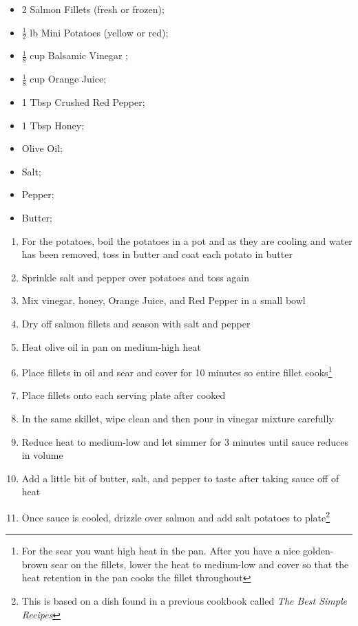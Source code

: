 \documentclass[oneside]{recipe}
\newcommand{\recipecolumn}[2]{
	\begin{multicols}{2}
	\raggedcolumns
	#1
	\columnbreak
	#2
	\end{multicols}
}
\begin{document}
\recipecolumn{
	\begin{itemize}
	\item 2 Salmon Fillets (fresh or frozen);
	\item $\frac{1}{2}$ lb Mini Potatoes (yellow or red);
	\item $\frac{1}{8}$ cup Balsamic Vinegar ;
	\item $\frac{1}{8}$ cup Orange Juice;
	\item 1 Tbsp Crushed Red Pepper;
	\item 1 Tbsp Honey;
	\item Olive Oil;
  \item Salt;
	\item Pepper;
	\item Butter;
	\end{itemize}
}{
	\begin{enumerate}
		\item For the potatoes, boil the potatoes in a pot and as they are cooling and water has been removed, toss in butter and coat each potato in butter
		\item Sprinkle salt and pepper over potatoes and toss again
		\item Mix vinegar, honey, Orange Juice, and Red Pepper in a small bowl
		\item Dry off salmon fillets and season with salt and pepper
		\item Heat olive oil in pan on medium-high heat
		\item Place fillets in oil and sear and cover for 10 minutes so entire fillet cooks\footnote{For the sear you want high heat in the pan. After you have a nice golden-brown sear on the fillets, lower the heat to medium-low and cover so that the heat retention in the pan cooks the fillet throughout}
		\item Place fillets onto each serving plate after cooked
		\item In the same skillet, wipe clean and then pour in vinegar mixture carefully
		\item Reduce heat to medium-low and let simmer for 3 minutes until sauce reduces in volume
		\item Add a little bit of butter, salt, and pepper to taste after taking sauce off of heat
		\item Once sauce is cooled, drizzle over salmon and add salt potatoes to plate\footnote{This is based on a dish found in a previous cookbook called \textit{The Best Simple Recipes}}
	\end{enumerate}
}
\newpage
\end{document}
